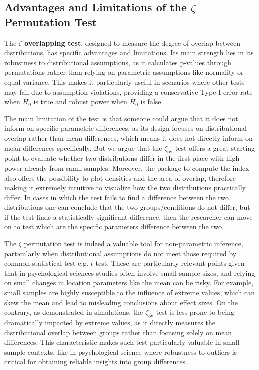 \documentclass[twocolumn]{article}\usepackage[]{graphicx}\usepackage[]{xcolor}
\begin{document}
\subsection*{Advantages and Limitations of the $\zeta$ Permutation Test}

The \textbf{$\zeta$  overlapping test}, designed to measure the degree of overlap between distributions, has specific advantages and limitations. Its main strength lies in its robustness to distributional assumptions, as it calculates p-values through permutations rather than relying on parametric assumptions like normality or equal variance. This makes it particularly useful in scenarios where other tests may fail due to assumption violations, providing a conservative Type I error rate when \(H_0\) is true and robust power when \(H_0\) is false.

The main limitation of the test is that someone could argue that it does not inform on specific parametric differences, as its design focuses on distributional overlap rather than mean differences, which means it does not directly inform on mean differences specifically. But we argue that the $\zeta_{\mbox{ov}}$ test offers a great starting point to evaluate whether two distributions differ in the first place with high power already from samll samples. Moreover, the package to compute the index also offers the possibility to plot densities and the area of overlap, therefore making it extremely intuitive to visualize how the two distributions practically differ. In cases in which the test fails to find a difference between the two distributions one can conclude that the two groups/conditions do not differ, but if the test finds a statistically significant difference, then the researcher can move on to test which are the specific parameters difference between the two.

The $\zeta$ permutation test is indeed a valuable tool for non-parametric inference, particularly when distributional assumptions do not meet those required by common statistical test e.g. $t$-test. These are particularly relevant points given that in psychological sciences studies often involve small sample sizes, and relying on small changes in location parameters like the mean can be risky. For example, small samples are highly susceptible to the influence of extreme values, which can skew the mean and lead to misleading conclusions about effect sizes. On the contrary, as demonstrated in simulations, the $\zeta_{\mbox{ov}}$ test is less prone to being dramatically impacted by extreme values, as it directly measures the distributional overlap between groups rather than focusing solely on mean differences. This characteristic makes such test particularly valuable in small-sample contexts, like in psychological science where robustness to outliers is critical for obtaining reliable insights into group differences.
\end{document}
